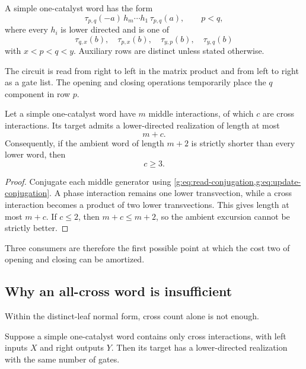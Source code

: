 \begin{definition}\label{g:def:simple-catalyst}
A simple one-catalyst word has the form
\[
\tau_{p,q}(-a)\,h_m\cdots h_1\,\tau_{p,q}(a),
\qquad p<q,
\]
where every $h_i$ is lower directed and is one of
\[
\tau_{q,x}(b),\quad \tau_{p,x}(b),\quad
\tau_{y,p}(b),\quad \tau_{y,q}(b)
\]
with $x<p<q<y$.  Auxiliary rows are distinct unless stated otherwise.
\end{definition}

The circuit is read from right to left in the matrix product and from left to right as a gate list.  The opening and closing operations temporarily place the $q$ component in row $p$.

\begin{proposition}\label{g:prop:cross-accounting}
Let a simple one-catalyst word have $m$ middle interactions, of which $c$ are cross interactions.  Its target admits a lower-directed realization of length at most
\[
m+c.
\]
Consequently, if the ambient word of length $m+2$ is strictly shorter than every lower word, then
\[
c\ge3.
\]
\end{proposition}

\begin{proof}
Conjugate each middle generator using \cref{g:eq:read-conjugation,g:eq:update-conjugation}.  A phase interaction remains one lower transvection, while a cross interaction becomes a product of two lower transvections.  This gives length at most $m+c$.  If $c\le2$, then $m+c\le m+2$, so the ambient excursion cannot be strictly better.
\end{proof}

Three consumers are therefore the first possible point at which the cost two of opening and closing can be amortized.

\subsection{Why an all-cross word is insufficient}

Within the distinct-leaf normal form, cross count alone is not enough.

\begin{lemma}\label{g:lem:all-cross-mirror}
Suppose a simple one-catalyst word contains only cross interactions, with left inputs $X$ and right outputs $Y$.  Then its target has a lower-directed realization with the same number of gates.
\end{lemma}

